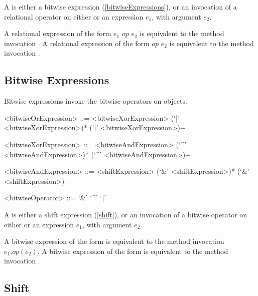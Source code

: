 \documentclass[makeidx]{article}
\begin{document}
{\LMHash{}%
A  is either a bitwise expression (\ref{bitwiseExpressions}), or an invocation of a relational operator on either \SUPER{} or an expression $e_1$, with argument $e_2$.

\LMHash{}%
A relational expression of the form $e_1$ $op$ $e_2$ is equivalent to the method invocation .
A relational expression of the form \SUPER{} $op$ $e_2$ is equivalent to the method invocation .


\subsection{Bitwise Expressions}

\LMHash{}%
Bitwise expressions invoke the bitwise operators on objects.

\begin{grammar}
<bitwiseOrExpression> ::= \gnewline{}
  <bitwiseXorExpression> (`|' <bitwiseXorExpression>)*
  \alt \SUPER{} (`|' <bitwiseXorExpression>)+

<bitwiseXorExpression> ::= \gnewline{}
  <bitwiseAndExpression> (`^' <bitwiseAndExpression>)*
  \alt \SUPER{} (`^' <bitwiseAndExpression>)+

<bitwiseAndExpression> ::= <shiftExpression> (`\&' <shiftExpression>)*
  \alt \SUPER{} (`\&' <shiftExpression>)+

<bitwiseOperator> ::= `\&'
  \alt `^'
  \alt `|'
\end{grammar}

\LMHash{}%
A  is either a shift expression (\ref{shift}), or an invocation of a bitwise operator on either \SUPER{} or an expression $e_1$, with argument $e_2$.

\LMHash{}%
A bitwise expression of the form  is equivalent to the method invocation $e_1.op(e_2)$.
A bitwise expression of the form  is equivalent to the method invocation .



\subsection{Shift}

}
\end{document}
